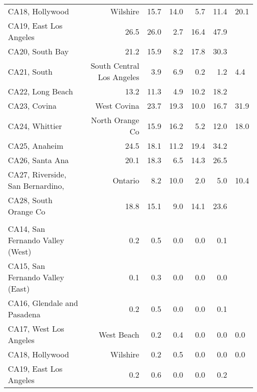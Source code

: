 \begin{longtable}[l]{l|rrrrr}
\hspace{1em}CA18, Hollywood & Wilshire & 15.7 & 14.0 & 5.7 & 11.4 & 20.1\\
\hspace{1em}CA19, East Los Angeles & 26.5 & 26.0 & 2.7 & 16.4 & 47.9\\
\hspace{1em}CA20, South Bay & 21.2 & 15.9 & 8.2 & 17.8 & 30.3\\
\hspace{1em}CA21, South & South Central Los Angeles & 3.9 & 6.9 & 0.2 & 1.2 & 4.4\\
\hspace{1em}CA22, Long Beach & 13.2 & 11.3 & 4.9 & 10.2 & 18.2\\
\hspace{1em}CA23, Covina & West Covina & 23.7 & 19.3 & 10.0 & 16.7 & 31.9\\
\hspace{1em}CA24, Whittier & North Orange Co & 15.9 & 16.2 & 5.2 & 12.0 & 18.0\\
\hspace{1em}CA25, Anaheim & 24.5 & 18.1 & 11.2 & 19.4 & 34.2\\
\hspace{1em}CA26, Santa Ana & 20.1 & 18.3 & 6.5 & 14.3 & 26.5\\
\hspace{1em}CA27, Riverside, San Bernardino, & Ontario & 8.2 & 10.0 & 2.0 & 5.0 & 10.4\\
\hspace{1em}CA28, South Orange Co & 18.8 & 15.1 & 9.0 & 14.1 & 23.6\\
\addlinespace[0.5em]
\\
\hspace{1em}CA14, San Fernando Valley (West) & 0.2 & 0.5 & 0.0 & 0.0 & 0.1\\
\hspace{1em}CA15, San Fernando Valley (East) & 0.1 & 0.3 & 0.0 & 0.0 & 0.0\\
\hspace{1em}CA16, Glendale and Pasadena & 0.2 & 0.5 & 0.0 & 0.0 & 0.1\\
\hspace{1em}CA17, West Los Angeles & West Beach & 0.2 & 0.4 & 0.0 & 0.0 & 0.0\\
\hspace{1em}CA18, Hollywood & Wilshire & 0.2 & 0.5 & 0.0 & 0.0 & 0.0\\
\hspace{1em}CA19, East Los Angeles & 0.2 & 0.6 & 0.0 & 0.0 & 0.2\\

\end{longtable}

